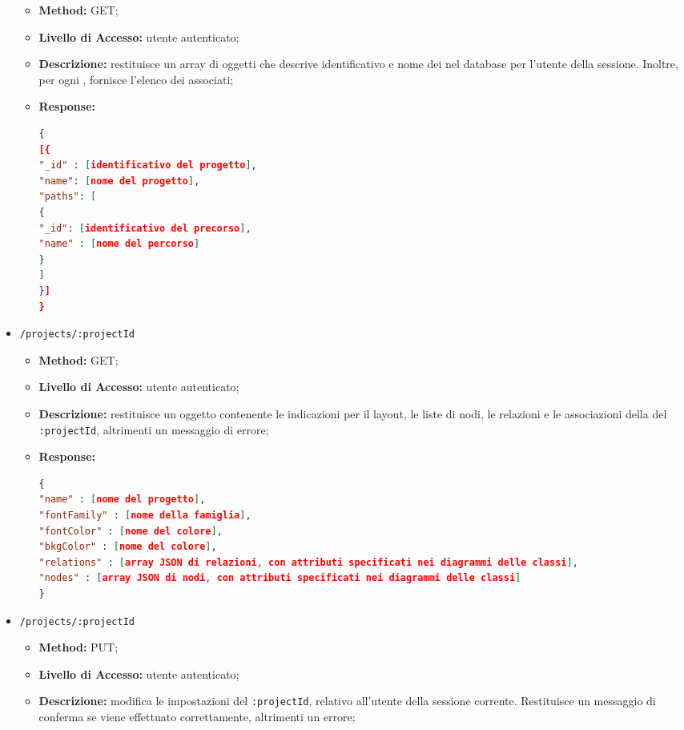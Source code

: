 \begin{itemize}
\begin{itemize}
\item \textbf{Method:} GET;
\item \textbf{Livello di Accesso:} utente autenticato;
\item \textbf{Descrizione:} restituisce  un array di oggetti  che descrive identificativo e nome dei  nel database per l'utente della sessione. Inoltre, per ogni , fornisce l'elenco dei  associati;
\item \textbf{Response:}
\begin{lstlisting}[language=json,firstnumber=1]
{
[{
"_id" : [identificativo del progetto],
"name": [nome del progetto],
"paths": [
{
"_id": [identificativo del precorso],
"name" : [nome del percorso]
}
]
}]
}
\end{lstlisting}
\end{itemize}
\item \texttt{/projects/:projectId}
\begin{itemize}
\item \textbf{Method:} GET;
\item \textbf{Livello di Accesso:} utente autenticato;
\item \textbf{Descrizione:} restituisce un oggetto  contenente le indicazioni per il layout, le liste di nodi, le relazioni e le associazioni della  del  \texttt{:projectId}, altrimenti un messaggio di errore;
\item \textbf{Response:}
\begin{lstlisting}[language=json,firstnumber=1]
{
"name" : [nome del progetto],
"fontFamily" : [nome della famiglia],
"fontColor" : [nome del colore],
"bkgColor" : [nome del colore],
"relations" : [array JSON di relazioni, con attributi specificati nei diagrammi delle classi],
"nodes" : [array JSON di nodi, con attributi specificati nei diagrammi delle classi]
}
\end{lstlisting}
\end{itemize}
\item \texttt{/projects/:projectId}
\begin{itemize}
\item \textbf{Method:} PUT;
\item \textbf{Livello di Accesso:} utente autenticato;
\item \textbf{Descrizione:} modifica le impostazioni del  \texttt{:projectId}, relativo all'utente della sessione corrente. Restituisce un messaggio di conferma se viene effettuato correttamente, altrimenti un errore;

\end{itemize}
\end{itemize}
